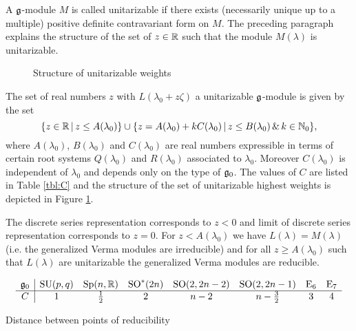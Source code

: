 A $\mathfrak{g}$-module $M$ is called unitarizable if there exists (necessarily unique up to a multiple) positive definite contravariant form on $M$. The preceding paragraph explains the structure of the set of $z\in\mathbb{R}$ such that the module $M(\lambda)$ is unitarizable.

\begin{figure}[H]\label{fig:struct}
  \begin{center}
  \end{center}\caption{Structure of unitarizable weights} %
\end{figure}

\begin{theorem}
 The set of real numbers $z$ with $L(\lambda_0 + z\zeta)$ a unitarizable $\mathfrak{g}$-module is given by the set
\[
  \{z \in \mathbb{R}\, |\, z \leq A(\lambda_0)\} \cup \{ z=A(\lambda_0) + k C(\lambda_0)\,|\, z \leq B(\lambda_0) \,\&\, k\in \mathbb{N}_0\},
\]
where $A(\lambda_0)$, $B(\lambda_0)$ and $C(\lambda_0)$ are real numbers expressible in terms of certain root systems $Q(\lambda_0)$ and $R(\lambda_0)$ associated to $\lambda_0$. Moreover $C(\lambda_0)$ is independent of $\lambda_0$ and depends only on the type of $\mathfrak{g}_0$. The values of $C$ are listed in Table \ref{tbl:C} and the structure of the set of unitarizable highest weights is depicted in Figure \ref{fig:struct}.
	
The discrete series representation corresponds to $z <0$ and limit of discrete series representation corresponds to $z=0$. For $z  < A(\lambda_0)$ we have $L(\lambda) = M(\lambda)$ (i.e. the generalized Verma modules are irreducible) and for all $z \geq A(\lambda_0)$ such that $L(\lambda)$ are unitarizable the generalized Verma modules are reducible.%

\begin{table}[h]\label{tbl:C}
\[\begin{array}{c|ccccccc}
\mathfrak{g}_0 & \mathrm{SU}(p,q) & \mathrm{Sp}(n,\mathbb{R}) & \mathrm{SO}^*(2n) & \mathrm{SO}(2,2n-2) & \mathrm{SO}(2,2n-1) & \mathrm{E}_6 & \mathrm{E}_7\\\hline
C & 1 & \frac{1}{2} & 2 & n-2 & n-\frac{3}{2} & 3 & 4
\end{array}\]\caption{Distance between points of reducibility}
\end{table}
\end{theorem}

